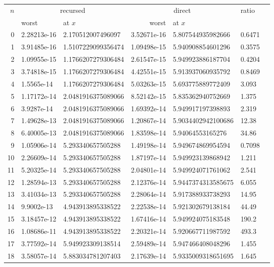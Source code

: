 \begin{tabular}{rllrllr}
\toprule
$n$ & \multicolumn{2}{c}{recursed} & \multicolumn{2}{c}{direct} & ratio\\
\cmidrule(lr){2-3}\cmidrule(lr){4-5}
 & worst & at $x$ & worst & at $x$ &\\
\midrule
 0 & 2.28213e-16 & 2.170512007496097 & 3.52671e-16 & 5.807544935982666 & 0.6471\\
 1 & 3.91485e-16 & 1.5107229099356474 & 1.09498e-15 & 5.940908854601296 & 0.3575\\
 2 & 1.09955e-15 & 1.1766207279306484 & 2.61547e-15 & 5.949923886187704 & 0.4204\\
 3 & 3.74818e-15 & 1.1766207279306484 & 4.42551e-15 & 5.913937060935792 & 0.8469\\
 4 & 1.5565e-14 & 1.1766207279306484 & 5.03263e-15 & 5.693775889772409 & 3.093\\
 5 & 1.17172e-14 & 2.0481916375089066 & 8.52142e-15 & 5.835362940752669 & 1.375\\
 6 & 3.9287e-14 & 2.0481916375089066 & 1.69392e-14 & 5.949917197398893 & 2.319\\
 7 & 1.49628e-13 & 2.0481916375089066 & 1.20867e-14 & 5.9034402942100686 & 12.38\\
 8 & 6.40005e-13 & 2.0481916375089066 & 1.83598e-14 & 5.94064553165276 & 34.86\\
 9 & 1.05906e-14 & 5.293340657505288 & 1.49198e-14 & 5.949674869954594 & 0.7098\\
10 & 2.26609e-14 & 5.293340657505288 & 1.87197e-14 & 5.949923139868942 & 1.211\\
11 & 5.20325e-14 & 5.293340657505288 & 2.04801e-14 & 5.949924071761062 & 2.541\\
12 & 1.28594e-13 & 5.293340657505288 & 2.12376e-14 & 5.9447374313585675 & 6.055\\
13 & 3.41034e-13 & 5.293340657505288 & 2.28064e-14 & 5.917388933738293 & 14.95\\
14 & 9.9002e-13 & 4.943913895338522 & 2.22538e-14 & 5.921302679138184 & 44.49\\
15 & 3.18457e-12 & 4.943913895338522 & 1.67416e-14 & 5.949924075183548 & 190.2\\
16 & 1.08686e-11 & 4.943913895338522 & 2.20321e-14 & 5.920667711987592 & 493.3\\
17 & 3.77592e-14 & 5.949923309138514 & 2.59489e-14 & 5.947466408048296 & 1.455\\
18 & 3.58057e-14 & 5.883034781207403 & 2.17639e-14 & 5.9335009318651695 & 1.645\\

\end{tabular}
